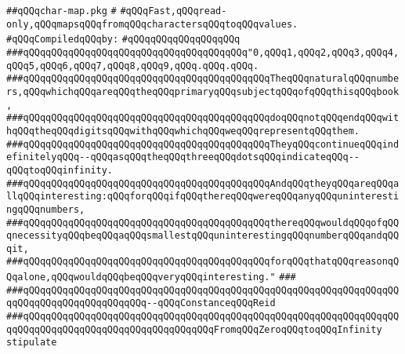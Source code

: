 \label{src/lib/src/char-map.pkg}
\verb|##qQQqchar-map.pkg|\newline
\verb|#|\newline
\verb|#qQQqFast,qQQqread-only,qQQqmapsqQQqfromqQQqcharactersqQQqtoqQQqvalues.|\newline
\newline
\verb|#qQQqCompiledqQQqby:|\newline
\verb|#qQQqqQQqqQQqqQQqqQQq|\newline
\newline
\newline
\newline
\verb|###qQQqqQQqqQQqqQQqqQQqqQQqqQQqqQQqqQQqqQQq"0,qQQq1,qQQq2,qQQq3,qQQq4,qQQq5,qQQq6,qQQq7,qQQq8,qQQq9,qQQq.qQQq.qQQq.|\newline
\verb|###qQQqqQQqqQQqqQQqqQQqqQQqqQQqqQQqqQQqqQQqqQQqTheqQQqnaturalqQQqnumbers,qQQqwhichqQQqareqQQqtheqQQqprimaryqQQqsubjectqQQqofqQQqthisqQQqbook,|\newline
\verb|###qQQqqQQqqQQqqQQqqQQqqQQqqQQqqQQqqQQqqQQqqQQqdoqQQqnotqQQqendqQQqwithqQQqtheqQQqdigitsqQQqwithqQQqwhichqQQqweqQQqrepresentqQQqthem.|\newline
\verb|###qQQqqQQqqQQqqQQqqQQqqQQqqQQqqQQqqQQqqQQqqQQqTheyqQQqcontinueqQQqindefinitelyqQQq--qQQqasqQQqtheqQQqthreeqQQqdotsqQQqindicateqQQq--qQQqtoqQQqinfinity.|\newline
\verb|###qQQqqQQqqQQqqQQqqQQqqQQqqQQqqQQqqQQqqQQqqQQqAndqQQqtheyqQQqareqQQqallqQQqinteresting:qQQqforqQQqifqQQqthereqQQqwereqQQqanyqQQquninterestingqQQqnumbers,|\newline
\verb|###qQQqqQQqqQQqqQQqqQQqqQQqqQQqqQQqqQQqqQQqqQQqthereqQQqwouldqQQqofqQQqnecessityqQQqbeqQQqaqQQqsmallestqQQquninterestingqQQqnumberqQQqandqQQqit,|\newline
\verb|###qQQqqQQqqQQqqQQqqQQqqQQqqQQqqQQqqQQqqQQqqQQqforqQQqthatqQQqreasonqQQqalone,qQQqwouldqQQqbeqQQqveryqQQqinteresting."|\newline
\verb|###|\newline
\verb|###qQQqqQQqqQQqqQQqqQQqqQQqqQQqqQQqqQQqqQQqqQQqqQQqqQQqqQQqqQQqqQQqqQQqqQQqqQQqqQQqqQQqqQQqqQQq--qQQqConstanceqQQqReid|\newline
\verb|###qQQqqQQqqQQqqQQqqQQqqQQqqQQqqQQqqQQqqQQqqQQqqQQqqQQqqQQqqQQqqQQqqQQqqQQqqQQqqQQqqQQqqQQqqQQqqQQqqQQqqQQqFromqQQqZeroqQQqtoqQQqInfinity|\newline
\newline
\newline
\verb|stipulate|\newline
